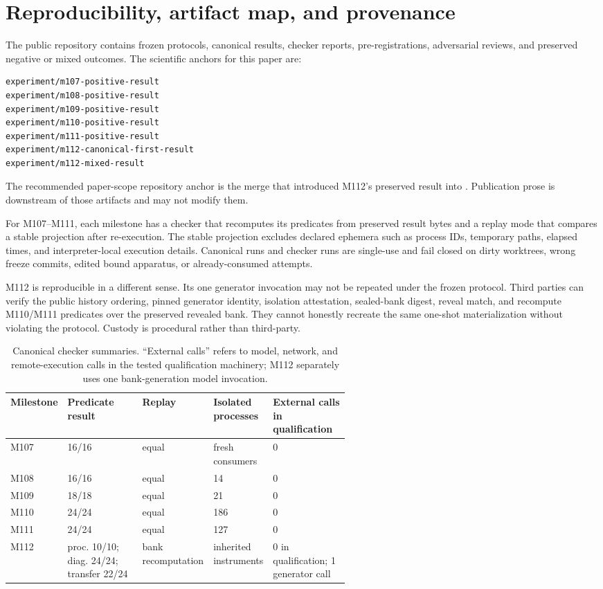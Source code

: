 \section{Reproducibility, artifact map, and provenance}
\label{sec:repro}
The public repository contains frozen protocols, canonical results, checker reports, pre-registrations, adversarial reviews, and preserved negative or mixed outcomes. The scientific anchors for this paper are:
\begin{Verbatim}[fontsize=\small]
experiment/m107-positive-result
experiment/m108-positive-result
experiment/m109-positive-result
experiment/m110-positive-result
experiment/m111-positive-result
experiment/m112-canonical-first-result
experiment/m112-mixed-result
\end{Verbatim}
The recommended paper-scope repository anchor is the merge that introduced M112's preserved result into . Publication prose is downstream of those artifacts and may not modify them.

For M107--M111, each milestone has a checker that recomputes its predicates from preserved result bytes and a replay mode that compares a stable projection after re-execution. The stable projection excludes declared ephemera such as process IDs, temporary paths, elapsed times, and interpreter-local execution details. Canonical runs and checker runs are single-use and fail closed on dirty worktrees, wrong freeze commits, edited bound apparatus, or already-consumed attempts.

M112 is reproducible in a different sense. Its one generator invocation may not be repeated under the frozen protocol. Third parties can verify the public history ordering, pinned generator identity, isolation attestation, sealed-bank digest, reveal match, and recompute M110/M111 predicates over the preserved revealed bank. They cannot honestly recreate the same one-shot materialization without violating the protocol. Custody is procedural rather than third-party.

\begin{table}[H]
\centering
\small
\caption{Canonical checker summaries. ``External calls'' refers to model, network, and remote-execution calls in the tested qualification machinery; M112 separately uses one bank-generation model invocation.}
\label{tab:checker}
\begin{tabularx}{\textwidth}{@{}l p{0.22\linewidth} p{0.18\linewidth} p{0.17\linewidth} X@{}}
\toprule
Milestone & Predicate result & Replay & Isolated processes & External calls in qualification \\
\midrule
M107 & 16/16 & equal & fresh consumers & 0 \\
M108 & 16/16 & equal & 14 & 0 \\
M109 & 18/18 & equal & 21 & 0 \\
M110 & 24/24 & equal & 186 & 0 \\
M111 & 24/24 & equal & 127 & 0 \\
M112 & proc. 10/10; diag. 24/24; transfer 22/24 & bank recomputation & inherited instruments & 0 in qualification; 1 generator call \\
\bottomrule
\end{tabularx}
\end{table}

